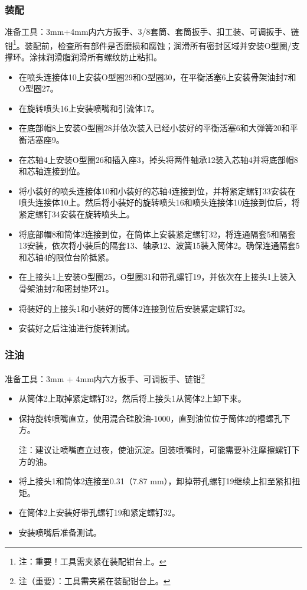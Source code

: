 \subsubsection{装配}
准备工具：3mm+4mm内六方扳手、3/8\inch 套筒、套筒扳手、扣工装、可调扳手、链钳\footnote{注：重要！工具需夹紧在装配钳台上。}。装配前，检查所有部件是否磨损和腐蚀；润滑所有密封区域并安装O型圈/支撑环。涂抹润滑脂润滑所有螺纹防止粘扣。
\begin{itemize}
	\item 在喷头连接体10上安装O型圈29和O型圈30，在平衡活塞6上安装骨架油封7和O型圈27。
	
	\item 在旋转喷头16上安装喷嘴和引流体17。
	
	\item 在底部帽8上安装O型圈28并依次装入已经小装好的平衡活塞6和大弹簧20和平衡活塞座9。
	
	\item 在芯轴4上安装O型圈26和插入座3，掉头将两件轴承12装入芯轴4并将底部帽8和芯轴连接到位。
	
	\item 将小装好的喷头连接体10和小装好的芯轴4连接到位，并将紧定螺钉33安装在喷头连接体10上。然后将小装好的旋转喷头16和喷头连接体10连接到位后，将紧定螺钉34安装在旋转喷头上。
	
	\item 将底部帽8和筒体2连接到位，在筒体上安装紧定螺钉32，将连通隔套5和隔套13安装，依次将小装后的隔套13、轴承12、波簧15装入筒体2。确保连通隔套5和芯轴4的限位台阶抵紧。
	
	\item 在上接头1上安装O型圈25，O型圈31和带孔螺钉19，并依次在上接头1上装入骨架油封7和密封垫环21。
	
	\item 将装好的上接头1和小装好的筒体2连接到位后安装紧定螺钉32。
	
	\item 安装好之后注油进行旋转测试。
\end{itemize}
	
	
\subsubsection{注油}

准备工具：3mm + 4mm内六方扳手、可调扳手、链钳\footnote{
注（重要）：工具需夹紧在装配钳台上。}

\begin{itemize}

	\item 从筒体2上取掉紧定螺钉32，然后将上接头1从筒体2上卸下来。
	\item 保持旋转喷嘴直立，使用混合硅胶油-1000，直到油位位于筒体2的槽螺孔下方。
 
注：建议让喷嘴直立过夜，使油沉淀。回装喷嘴时，可能需要补注摩擦螺钉下方的油。

	\item 将上接头1和筒体2连接至0.31\inch（7.87 mm），卸掉带孔螺钉19继续上扣至紧扣扭矩。
	
	\item 在筒体2上安装好带孔螺钉19和紧定螺钉32。
 
	\item 安装喷嘴后准备测试。
	\end{itemize}
	
